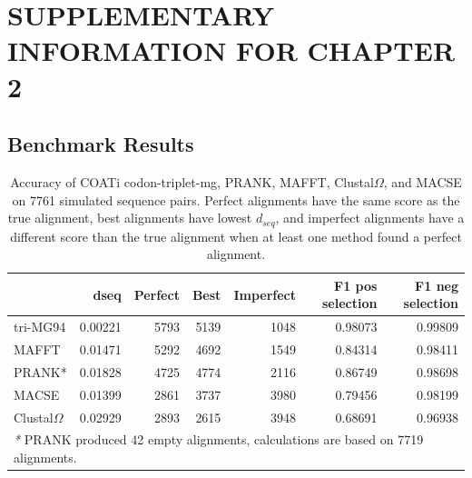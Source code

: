 \chapter{SUPPLEMENTARY INFORMATION FOR CHAPTER 2} \label{ch:alignpair-supplement}

\clearpage

\section*{Benchmark Results}

\begin{table}[H]
\centering
\begin{tabular}[t]{l|r|r|r|r|r|r}
\hline
  & dseq & Perfect & Best & Imperfect & F1 pos selection & F1 neg selection\\
\hline
tri-MG94 & 0.00221 & 5793 & 5139 & 1048 & 0.98073 & 0.99809\\
\hline
MAFFT & 0.01471 & 5292 & 4692 & 1549 & 0.84314 & 0.98411\\
\hline
PRANK* & 0.01828 & 4725 & 4774 & 2116 & 0.86749 & 0.98698\\
\hline
MACSE & 0.01399 & 2861 & 3737 & 3980 & 0.79456 & 0.98199\\
\hline
Clustal$\Omega$ & 0.02929 & 2893 & 2615 & 3948 & 0.68691 & 0.96938\\
\hline
\multicolumn{7}{l}{\rule{0pt}{1em}\textit{*} PRANK produced 42 empty alignments, calculations are based on 7719 alignments.}\\
\end{tabular}
\caption[COATi Triplet-MG94 Benchmark Results]{Accuracy of COATi codon-triplet-mg, PRANK, MAFFT, Clustal$\Omega$, and MACSE on 7761 simulated sequence pairs. Perfect alignments have the same score as the true alignment, best alignments have lowest $d_{seq}$, and imperfect alignments have a different score than the true alignment when at least one method found a perfect alignment.}
\end{table}\label{table:results-tri-mg}


